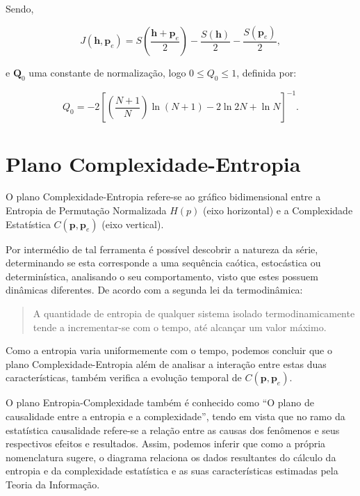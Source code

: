 Sendo,

\begin{equation}
J(\bm h, \bm p_e) = S\left(\frac{\bm h + \bm p_e}{2}\right) - \frac{S(\bm h)}{2} - \frac{S(\bm p_e)}{2},
\end{equation}

e $\bm Q_0$ uma constante de normalização, logo $0 \leq Q_0 \leq 1$, definida por:

\begin{equation}
Q_0 = -2 \left[ \left(\frac{N + 1}{N} \right) \ln(N + 1) - 2 \ln{2N} + \ln{N} \right]^{-1}.
\end{equation}

\section{Plano Complexidade-Entropia}

 O plano Complexidade-Entropia refere-se ao gráfico bidimensional entre a Entropia de Permutação Normalizada $H(p)$ (eixo horizontal) e a Complexidade Estatística $C(\bm p, \bm p_e)$ (eixo vertical). 

 Por intermédio de tal ferramenta é possível descobrir a natureza da série, determinando se esta corresponde a uma sequência caótica, estocástica ou determinística, analisando o seu comportamento, visto que estes possuem dinâmicas diferentes. De acordo com a segunda lei da termodinâmica:
 
 \begin{quote}
A quantidade de entropia de qualquer sistema isolado termodinamicamente tende a incrementar-se com o tempo, até alcançar um valor máximo. 
 \end{quote}

 Como a entropia varia uniformemente com o tempo, podemos concluir que o plano Complexidade-Entropia além de analisar a interação entre estas duas características, também verifica a evolução temporal de $C(\bm p, \bm p_e)$.

 O plano Entropia-Complexidade também é conhecido como “O plano de causalidade entre a entropia e a complexidade”, tendo em vista que no ramo da estatística causalidade refere-se a relação entre as causas dos fenômenos e seus respectivos efeitos e resultados. Assim, podemos inferir que como a própria nomenclatura sugere, o diagrama relaciona os dados resultantes do cálculo da entropia e da complexidade estatística e as suas características estimadas pela Teoria da Informação. 

